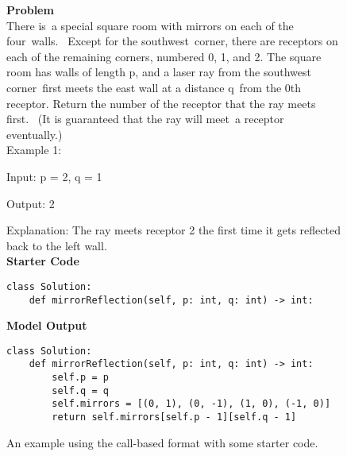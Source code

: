 \begin{figure*}
    \textbf{Problem} \\
    There is a special square room with mirrors on each of the four walls.  Except for the southwest corner, there are receptors on each of the remaining corners, numbered 0, 1, and 2. The square room has walls of length p, and a laser ray from the southwest corner first meets the east wall at a distance q from the 0th receptor. Return the number of the receptor that the ray meets first.  (It is guaranteed that the ray will meet a receptor eventually.)
    \\
    
    Example 1:
    
    Input: p = 2, q = 1
    
    Output: 2
    
    Explanation: The ray meets receptor 2 the first time it gets reflected back to the left wall.
    \\

    \textbf{Starter Code}
    
    \begin{small}
\begin{verbatim}
class Solution:
    def mirrorReflection(self, p: int, q: int) -> int:
\end{verbatim}
\end{small}

 \textbf{Model Output}
 \begin{small}
\begin{verbatim}
class Solution:
    def mirrorReflection(self, p: int, q: int) -> int:
        self.p = p
        self.q = q
        self.mirrors = [(0, 1), (0, -1), (1, 0), (-1, 0)]
        return self.mirrors[self.p - 1][self.q - 1]
\end{verbatim}
\end{small}
    \caption{An example using the call-based format with some starter code.}
    \label{fig:supp_sample_3}
\end{figure*}

